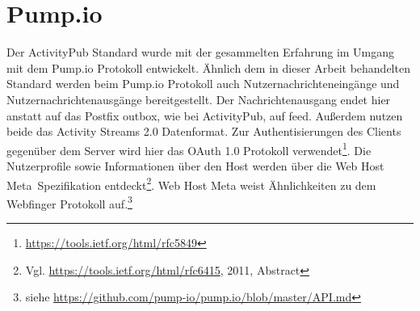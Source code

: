 \section{Pump.io}
\label{sub:pumpio}
	Der ActivityPub Standard wurde mit der gesammelten Erfahrung im Umgang mit dem Pump.io Protokoll entwickelt. Ähnlich dem in dieser Arbeit behandelten Standard werden beim Pump.io Protokoll auch Nutzernachrichteneingänge und Nutzernachrichtenausgänge bereitgestellt. Der Nachrichtenausgang endet hier anstatt auf das Postfix \glqq outbox\grqq, wie bei ActivityPub, auf \glqq feed\grqq. Außerdem nutzen beide das Activity Streams 2.0 Datenformat. Zur Authentisierungen des Clients gegenüber dem Server wird hier das OAuth 1.0 Protokoll verwendet\footnote{\url{https://tools.ietf.org/html/rfc5849}}. Die Nutzerprofile sowie Informationen über den Host werden über die \glqq Web Host Meta\grqq~Spezifikation entdeckt\footnote{Vgl. \url{https://tools.ietf.org/html/rfc6415}, 2011, Abstract}. Web Host Meta weist Ähnlichkeiten zu dem Webfinger Protokoll auf.\footnote{siehe \url{https://github.com/pump-io/pump.io/blob/master/API.md}}\\
	
